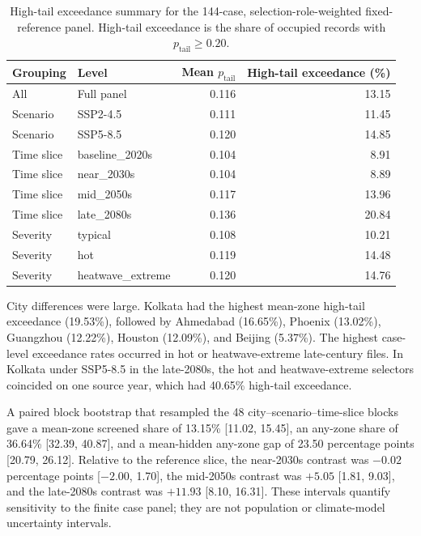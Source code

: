\begin{table}[htbp]
\centering
\caption{High-tail exceedance summary for the 144-case, selection-role-weighted fixed-reference panel. High-tail exceedance is the share of occupied records with $p_{\mathrm{tail}}\ge0.20$.}
\label{tab:panel_tail_summary}
\footnotesize
\begin{tabular}{llrr}
\toprule
\textbf{Grouping} & \textbf{Level} & \textbf{Mean $p_{\mathrm{tail}}$} & \textbf{High-tail exceedance (\%)} \\
\midrule
All & Full panel & 0.116 & 13.15 \\
\midrule
Scenario & SSP2-4.5 & 0.111 & 11.45 \\
Scenario & SSP5-8.5 & 0.120 & 14.85 \\
\midrule
Time slice & baseline\_2020s & 0.104 & 8.91 \\
Time slice & near\_2030s & 0.104 & 8.89 \\
Time slice & mid\_2050s & 0.117 & 13.96 \\
Time slice & late\_2080s & 0.136 & 20.84 \\
\midrule
Severity & typical & 0.108 & 10.21 \\
Severity & hot & 0.119 & 14.48 \\
Severity & heatwave\_extreme & 0.120 & 14.76 \\
\bottomrule
\end{tabular}
\end{table}

City differences were large. Kolkata had the highest mean-zone high-tail exceedance (19.53\%), followed by Ahmedabad (16.65\%), Phoenix (13.02\%), Guangzhou (12.22\%), Houston (12.09\%), and Beijing (5.37\%). The highest case-level exceedance rates occurred in hot or heatwave-extreme late-century files. In Kolkata under SSP5-8.5 in the late-2080s, the hot and heatwave-extreme selectors coincided on one source year, which had 40.65\% high-tail exceedance.

A paired block bootstrap that resampled the 48 city--scenario--time-slice blocks gave a mean-zone screened share of 13.15\% [11.02, 15.45], an any-zone share of 36.64\% [32.39, 40.87], and a mean-hidden any-zone gap of 23.50 percentage points [20.79, 26.12]. Relative to the reference slice, the near-2030s contrast was $-0.02$ percentage points [$-2.00$, 1.70], the mid-2050s contrast was $+5.05$ [1.81, 9.03], and the late-2080s contrast was $+11.93$ [8.10, 16.31]. These intervals quantify sensitivity to the finite case panel; they are not population or climate-model uncertainty intervals.

